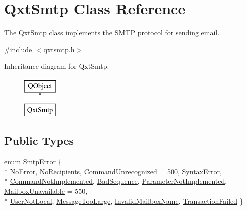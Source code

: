 \hypertarget{class_qxt_smtp}{\section{Qxt\-Smtp Class Reference}
\label{class_qxt_smtp}
}


The \hyperlink{class_qxt_smtp}{Qxt\-Smtp} class implements the S\-M\-T\-P protocol for sending email.  




{\ttfamily \#include $<$qxtsmtp.\-h$>$}

Inheritance diagram for Qxt\-Smtp\-:\begin{figure}[H]
\begin{center}
\leavevmode
\includegraphics[height=2.000000cm]{class_qxt_smtp}
\end{center}
\end{figure}
\subsection*{Public Types}
\begin{DoxyCompactItemize}
\item 
enum \hyperlink{class_qxt_smtp_a34a41e157894cc94e0a863249f29f673}{Smtp\-Error} \{ \\*
\hyperlink{class_qxt_smtp_a34a41e157894cc94e0a863249f29f673a5fd7d64d9fbbd7b83073e68e669092b9}{No\-Error}, 
\hyperlink{class_qxt_smtp_a34a41e157894cc94e0a863249f29f673a128008e25ab3079dbc766721c9945391}{No\-Recipients}, 
\hyperlink{class_qxt_smtp_a34a41e157894cc94e0a863249f29f673adcc62b4d695562b1bd2a6088eec3df15}{Command\-Unrecognized} = 500, 
\hyperlink{class_qxt_smtp_a34a41e157894cc94e0a863249f29f673a4614404d6d4ddb356304741e5d631fe0}{Syntax\-Error}, 
\\*
\hyperlink{class_qxt_smtp_a34a41e157894cc94e0a863249f29f673a0b7b762023060c981debbc4557a1ca2a}{Command\-Not\-Implemented}, 
\hyperlink{class_qxt_smtp_a34a41e157894cc94e0a863249f29f673a91468bda8899a5d7171e40c5fdd5a859}{Bad\-Sequence}, 
\hyperlink{class_qxt_smtp_a34a41e157894cc94e0a863249f29f673a31ede022abced4f4ce3e212c5f9713e7}{Parameter\-Not\-Implemented}, 
\hyperlink{class_qxt_smtp_a34a41e157894cc94e0a863249f29f673a8b41e83ad7489ed193a08a766df1af79}{Mailbox\-Unavailable} = 550, 
\\*
\hyperlink{class_qxt_smtp_a34a41e157894cc94e0a863249f29f673a17de40f8b621b7b1ae22adbc540b7f9c}{User\-Not\-Local}, 
\hyperlink{class_qxt_smtp_a34a41e157894cc94e0a863249f29f673a412368530ab0ccad5cd041bf7200b40a}{Message\-Too\-Large}, 
\hyperlink{class_qxt_smtp_a34a41e157894cc94e0a863249f29f673adfd2aaa00f2cf7019fbb0e216d7b5b7d}{Invalid\-Mailbox\-Name}, 
\hyperlink{class_qxt_smtp_a34a41e157894cc94e0a863249f29f673a4bcdf76ce51b6f077b0c3f7621c2d7b5}{Transaction\-Failed}
 \}
\end{DoxyCompactItemize}
